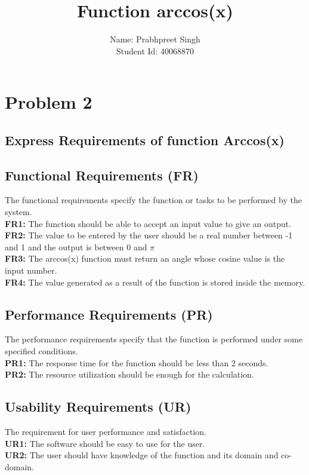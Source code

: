 \documentclass[12pt]{report}
\begin{document}
\title{Function arccos(x)} %
\author{Name: Prabhpreet Singh \\Student Id: 40068870} %

\maketitle
\section*{Problem 2} %
\subsection*{Express Requirements of function Arccos(x)}
\subsection*{Functional Requirements (FR)}
The functional requirements specify the function or tasks to be performed by the system.\\ 
	\textbf{FR1: }The function should be able to accept an input value to give an output.\\
	\textbf{FR2: }The value to be entered by the user should be a real number between -1 and 1 and the output is between 0 and $\pi$\\
	\textbf{FR3: }The arccos(x) function must return an angle whose cosine value is the input number.\\
	\textbf{FR4: }The value generated as a result of the function is stored inside the memory.

\subsection*{Performance Requirements (PR)}The performance requirements specify that the function is performed under some specified conditions.\\
\textbf{PR1: }The response time for the function should be less than 2 seconds.\\
	\textbf{PR2: }The resource utilization should be enough for the calculation.
\subsection*{Usability Requirements (UR)}The requirement for user performance and satisfaction.\\
	\textbf{UR1: }The software should be easy to use for the user. \\
	\textbf{UR2: }The user should have knowledge of the function and its domain and co-domain.
\end{document}
